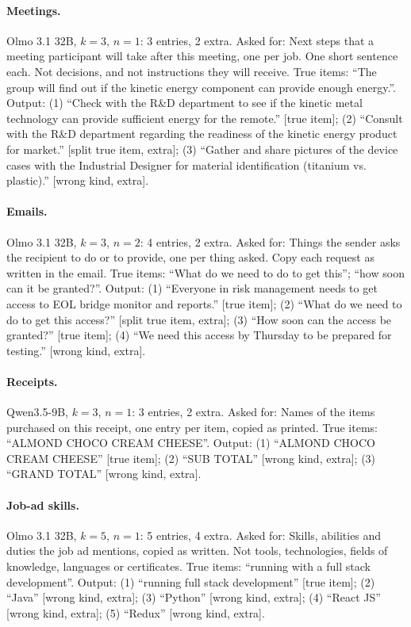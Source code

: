 \paragraph{Meetings.} Olmo 3.1 32B, $k = 3$, $n = 1$: 3 entries, 2 extra.
Asked for: Next steps that a meeting participant will take after this meeting, one per job. One short sentence each. Not decisions, and not instructions they will receive.
True items: ``The group will find out if the kinetic energy component can provide enough energy.''.
Output: (1) ``Check with the R\&D department to see if the kinetic metal technology can provide sufficient energy for the remote.'' [true item]; (2) ``Consult with the R\&D department regarding the readiness of the kinetic energy product for market.'' [split true item, extra]; (3) ``Gather and share pictures of the device cases with the Industrial Designer for material identification (titanium vs. plastic).'' [wrong kind, extra].

\paragraph{Emails.} Olmo 3.1 32B, $k = 3$, $n = 2$: 4 entries, 2 extra.
Asked for: Things the sender asks the recipient to do or to provide, one per thing asked. Copy each request as written in the email.
True items: ``What do we need to do to get this''; ``how soon can it be granted?''.
Output: (1) ``Everyone in risk management needs to get access to EOL bridge monitor and reports.'' [true item]; (2) ``What do we need to do to get this access?'' [split true item, extra]; (3) ``How soon can the access be granted?'' [true item]; (4) ``We need this access by Thursday to be prepared for testing.'' [wrong kind, extra].

\paragraph{Receipts.} Qwen3.5-9B, $k = 3$, $n = 1$: 3 entries, 2 extra.
Asked for: Names of the items purchased on this receipt, one entry per item, copied as printed.
True items: ``ALMOND CHOCO CREAM CHEESE''.
Output: (1) ``ALMOND CHOCO CREAM CHEESE'' [true item]; (2) ``SUB TOTAL'' [wrong kind, extra]; (3) ``GRAND TOTAL'' [wrong kind, extra].

\paragraph{Job-ad skills.} Olmo 3.1 32B, $k = 5$, $n = 1$: 5 entries, 4 extra.
Asked for: Skills, abilities and duties the job ad mentions, copied as written. Not tools, technologies, fields of knowledge, languages or certificates.
True items: ``running with a full stack development''.
Output: (1) ``running full stack development'' [true item]; (2) ``Java'' [wrong kind, extra]; (3) ``Python'' [wrong kind, extra]; (4) ``React JS'' [wrong kind, extra]; (5) ``Redux'' [wrong kind, extra].


